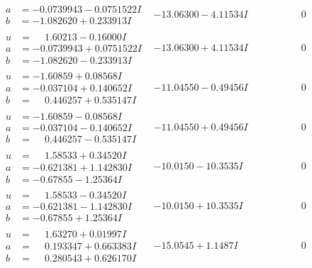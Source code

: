 \documentclass[1p]{elsarticle_modified}
\theoremstyle{definition}
\begin{document}
$$\begin{array}{c|c|c}
\begin{aligned}
a &= -0.0739943 - 0.0751522 I \\
b &= -1.082620 + 0.233913 I\end{aligned}
 & -13.06300 - 4.11534 I & \phantom{-0.000000 } 0 \\ \hline\begin{aligned}
u &= \phantom{-}1.60213 - 0.16000 I \\
a &= -0.0739943 + 0.0751522 I \\
b &= -1.082620 - 0.233913 I\end{aligned}
 & -13.06300 + 4.11534 I & \phantom{-0.000000 } 0 \\ \hline\begin{aligned}
u &= -1.60859 + 0.08568 I \\
a &= -0.037104 + 0.140652 I \\
b &= \phantom{-}0.446257 + 0.535147 I\end{aligned}
 & -11.04550 - 0.49456 I & \phantom{-0.000000 } 0 \\ \hline\begin{aligned}
u &= -1.60859 - 0.08568 I \\
a &= -0.037104 - 0.140652 I \\
b &= \phantom{-}0.446257 - 0.535147 I\end{aligned}
 & -11.04550 + 0.49456 I & \phantom{-0.000000 } 0 \\ \hline\begin{aligned}
u &= \phantom{-}1.58533 + 0.34520 I \\
a &= -0.621381 + 1.142830 I \\
b &= -0.67855 - 1.25364 I\end{aligned}
 & -10.0150 - 10.3535 I & \phantom{-0.000000 } 0 \\ \hline\begin{aligned}
u &= \phantom{-}1.58533 - 0.34520 I \\
a &= -0.621381 - 1.142830 I \\
b &= -0.67855 + 1.25364 I\end{aligned}
 & -10.0150 + 10.3535 I & \phantom{-0.000000 } 0 \\ \hline\begin{aligned}
u &= \phantom{-}1.63270 + 0.01997 I \\
a &= \phantom{-}0.193347 + 0.663383 I \\
b &= \phantom{-}0.280543 + 0.626170 I\end{aligned}
 & -15.0545 + 1.1487 I & \phantom{-0.000000 } 0 \\ \hline\begin{aligned}

\end{aligned}
\end{array}$$
\end{document}
